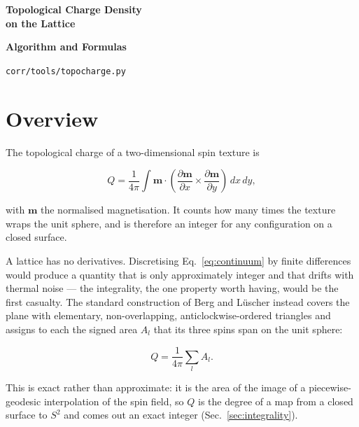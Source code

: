 \documentclass[12pt, a4paper, oneside]{article}
\newcommand{\mvec}{\mathbf{m}}
\begin{document}
\thispagestyle{empty}
\vspace*{\fill}
\begin{center}
    \Huge\textbf{Topological Charge Density\\on the Lattice}

    \vspace{1cm}
    \Large\textbf{Algorithm and Formulas}

    \vspace{0.8cm}
    \large \texttt{corr/tools/topocharge.py}
\end{center}
\vspace*{\fill}

\newpage
\tableofcontents
\newpage

\section{Overview}

The topological charge of a two-dimensional spin texture is

\begin{equation}
    Q = \frac{1}{4\pi}\int \mvec\cdot
        \left(\frac{\partial\mvec}{\partial x}\times
              \frac{\partial\mvec}{\partial y}\right)\,dx\,dy ,
    \label{eq:continuum}
\end{equation}

with $\mvec$ the normalised magnetisation. It counts how many times the texture
wraps the unit sphere, and is therefore an integer for any configuration on a
closed surface.

A lattice has no derivatives. Discretising Eq.~\eqref{eq:continuum} by finite
differences would produce a quantity that is only approximately integer and
that drifts with thermal noise --- the integrality, the one property worth
having, would be the first casualty. The standard construction of Berg and
L\"uscher instead covers the plane with elementary, non-overlapping,
anticlockwise-ordered triangles and assigns to each the signed area $A_l$ that
its three spins span on the unit sphere:

\begin{equation}
\boxed{
    Q = \frac{1}{4\pi}\sum_l A_l .
}
\label{eq:berg}
\end{equation}

This is exact rather than approximate: it is the area of the image of a
piecewise-geodesic interpolation of the spin field, so $Q$ is the degree of a
map from a closed surface to $S^2$ and comes out an exact integer
(Sec.~\ref{sec:integrality}).
\end{document}
